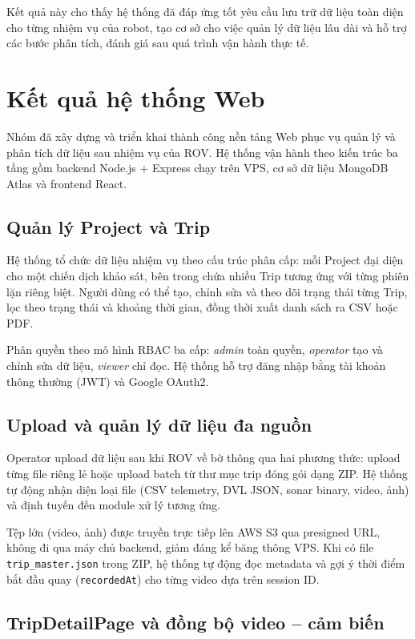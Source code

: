 \documentclass[../DoAn.tex]{subfiles}
\begin{document}
Kết quả này cho thấy hệ thống đã đáp ứng tốt yêu cầu lưu trữ dữ liệu toàn diện cho từng nhiệm vụ của robot, tạo cơ sở cho việc quản lý dữ liệu lâu dài và hỗ trợ các bước phân tích, đánh giá sau quá trình vận hành thực tế.

\section{Kết quả hệ thống Web}

Nhóm đã xây dựng và triển khai thành công nền tảng Web phục vụ quản lý và phân tích dữ liệu sau nhiệm vụ của ROV. Hệ thống vận hành theo kiến trúc ba tầng gồm backend Node.js + Express chạy trên VPS, cơ sở dữ liệu MongoDB Atlas và frontend React.

\subsection{Quản lý Project và Trip}

Hệ thống tổ chức dữ liệu nhiệm vụ theo cấu trúc phân cấp: mỗi Project đại diện cho một chiến dịch khảo sát, bên trong chứa nhiều Trip tương ứng với từng phiên lặn riêng biệt. Người dùng có thể tạo, chỉnh sửa và theo dõi trạng thái từng Trip, lọc theo trạng thái và khoảng thời gian, đồng thời xuất danh sách ra CSV hoặc PDF.

Phân quyền theo mô hình RBAC ba cấp: \textit{admin} toàn quyền, \textit{operator} tạo và chỉnh sửa dữ liệu, \textit{viewer} chỉ đọc. Hệ thống hỗ trợ đăng nhập bằng tài khoản thông thường (JWT) và Google OAuth2.

\subsection{Upload và quản lý dữ liệu đa nguồn}

Operator upload dữ liệu sau khi ROV về bờ thông qua hai phương thức: upload từng file riêng lẻ hoặc upload batch từ thư mục trip đóng gói dạng ZIP. Hệ thống tự động nhận diện loại file (CSV telemetry, DVL JSON, sonar binary, video, ảnh) và định tuyến đến module xử lý tương ứng.

Tệp lớn (video, ảnh) được truyền trực tiếp lên AWS S3 qua presigned URL, không đi qua máy chủ backend, giảm đáng kể băng thông VPS. Khi có file \texttt{trip\_master.json} trong ZIP, hệ thống tự động đọc metadata và gợi ý thời điểm bắt đầu quay (\texttt{recordedAt}) cho từng video dựa trên session ID.

\subsection{TripDetailPage và đồng bộ video -- cảm biến}
\end{document}
